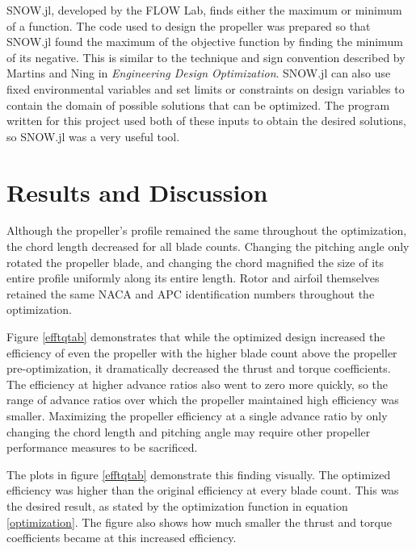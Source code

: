 \documentclass[journal ]{new-aiaa}
\begin{document}
SNOW.jl, developed by the FLOW Lab, finds either the maximum or minimum of a function. The code used to design the propeller was prepared so that SNOW.jl found the maximum of the objective function by finding the minimum of its negative. This is similar to the technique and sign convention described by Martins and Ning in \emph{Engineering Design Optimization}\cite{EngDesOpt}. SNOW.jl can also use fixed environmental variables and set limits or constraints on design variables to contain the domain of possible solutions that can be optimized. The program written for this project used both of these inputs to obtain the desired solutions, so SNOW.jl was a very useful tool.


\section{Results and Discussion}

Although the propeller's profile remained the same throughout the optimization, the chord length decreased for all blade counts. Changing the pitching angle only rotated the propeller blade, and changing the chord magnified the size of its entire profile uniformly along its entire length. Rotor and airfoil themselves retained the same NACA and APC identification numbers throughout the optimization.

Figure \eqref{efftqtab} demonstrates that while the optimized design increased the efficiency of even the propeller with the higher blade count above the propeller pre-optimization, it dramatically decreased the thrust and torque coefficients. The efficiency at higher advance ratios also went to zero more quickly, so the range of advance ratios over which the propeller maintained high efficiency was smaller. Maximizing the propeller efficiency at a single advance ratio by only changing the chord length and pitching angle may require other propeller performance measures to be sacrificed.

The plots in figure \eqref{efftqtab} demonstrate this finding visually. The optimized efficiency was higher than the original efficiency at every blade count. This was the desired result, as stated by the optimization function in equation \eqref{optimization}. The figure also shows how much smaller the thrust and torque coefficients became at this increased efficiency.
\end{document}
